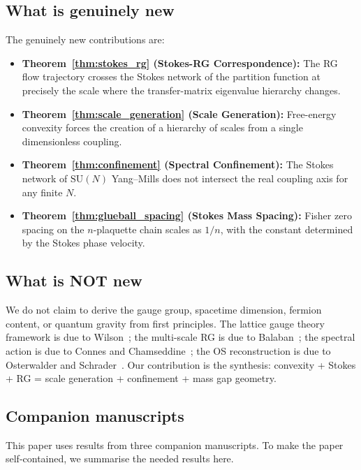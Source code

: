 \documentclass[12pt]{article}
\theoremstyle{definition}
\theoremstyle{remark}
\newcommand{\SU}{\mathrm{SU}}
\begin{document}
\subsection{What is genuinely new}

The genuinely new contributions are:
\begin{itemize}
\item \textbf{Theorem~\ref{thm:stokes_rg} (Stokes-RG
  Correspondence):}
  The RG flow trajectory crosses the Stokes network of the partition
  function at precisely the scale where the transfer-matrix eigenvalue
  hierarchy changes.
\item \textbf{Theorem~\ref{thm:scale_generation} (Scale Generation):}
  Free-energy convexity forces the creation of a hierarchy of scales
  from a single dimensionless coupling.
\item \textbf{Theorem~\ref{thm:confinement} (Spectral Confinement):}
  The Stokes network of $\SU(N)$ Yang--Mills does not intersect the
  real coupling axis for any finite $N$.
\item \textbf{Theorem~\ref{thm:glueball_spacing} (Stokes Mass
  Spacing):} Fisher zero spacing on the $n$-plaquette chain scales
  as $1/n$, with the constant determined by the Stokes phase velocity.
\end{itemize}

\subsection{What is NOT new}

We do not claim to derive the gauge group, spacetime dimension,
fermion content, or quantum gravity from first principles.
The lattice gauge theory framework is due to
Wilson~\cite{Wilson74}; the multi-scale RG is due to
Balaban~\cite{B85,B87}; the spectral action is due to Connes and
Chamseddine~\cite{CC97,CCM2007}; the OS reconstruction is due to
Osterwalder and Schrader~\cite{OS73}.  Our contribution is the
synthesis: convexity + Stokes + RG = scale generation +
confinement + mass gap geometry.

\subsection{Companion manuscripts}
\label{sec:companions}

This paper uses results from three companion manuscripts.  To make
the paper self-contained, we summarise the needed results here.
\end{document}
